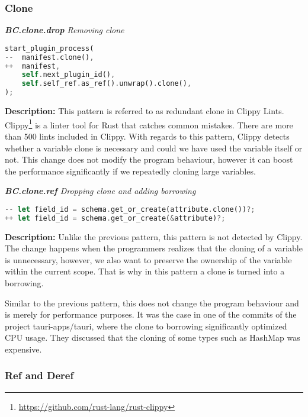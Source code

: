 \subsubsection{Clone}

\noindent \textit{ \textbf{BC.clone.drop} Removing clone}

\begin{lstlisting}[language=Rust, style=colouredRust]
start_plugin_process(
--  manifest.clone(),
++  manifest,
    self.next_plugin_id(),
    self.self_ref.as_ref().unwrap().clone(),
);
\end{lstlisting}

\noindent \textbf{Description:} This pattern is referred to as redundant clone in Clippy Lints. Clippy\footnote{\url{https://github.com/rust-lang/rust-clippy}} is a linter tool for Rust that catches common mistakes. There are more than 500 lints included in Clippy. With regards to this pattern, Clippy detects whether a variable clone is necessary and could we have used the variable itself or not. This change does not modify the program behaviour, however it can boost the performance significantly if we repeatedly cloning large variables. 

\noindent \textit{ \textbf{BC.clone.ref} Dropping clone and adding borrowing}

\begin{lstlisting}[language=Rust, style=colouredRust]
-- let field_id = schema.get_or_create(attribute.clone())?;
++ let field_id = schema.get_or_create(&attribute)?;
\end{lstlisting}

\noindent \textbf{Description:} Unlike the previous pattern, this pattern is not detected by Clippy. The change happens when the programmers realizes that the cloning of a variable is unnecessary, however, we also want to preserve the ownership of the variable within the current scope. That is why in this pattern a clone is turned into a borrowing. 

Similar to the previous pattern, this does not change the program behaviour and is merely for performance purposes. It was the case in one of the commits of the project tauri-apps/tauri, where the clone to borrowing significantly optimized CPU usage. They discussed that the cloning of some types such as HashMap was expensive. \\

\subsubsection{Ref and Deref}

